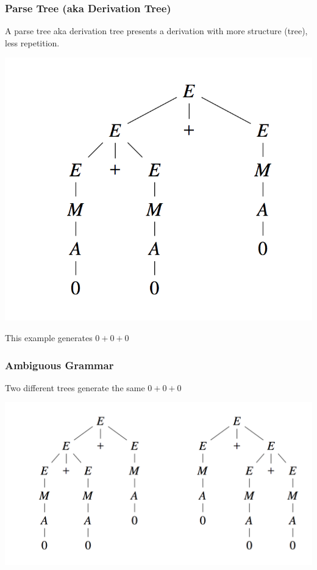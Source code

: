 \documentclass[12pt]{article}
\begin{document}
\subsubsection{Parse Tree (aka Derivation Tree)}

A parse tree aka derivation tree presents a derivation with more structure (tree), less repetition.

\includegraphics{syntax1}

This example generates $0+0+0$

\subsubsection{Ambiguous Grammar}

Two different trees generate the same $0+0+0$

\includegraphics[scale=0.7]{syntax2}
\end{document}
